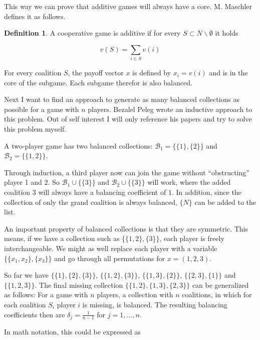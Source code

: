 \documentclass[10pt,a4paper,titlepage]{article}
\theoremstyle{plain}
\theoremstyle{definition}
\newtheorem{definition}[thm]{Definition} %
\begin{document}
This way we can prove that additive games will always have a core. M. Maschler\cite{maschler} defines it as follows.

\begin{definition}
    A cooperative game is additive if for every $S \subset N \backslash \emptyset$ it holds

    \begin{equation}
        v(S) = \sum_{i \in S}v(i)
    \end{equation}
\end{definition}

For every coalition $S$, the payoff vector $x$ is defined by $x_i = v(i)$ and is in the core of the subgame. Each subgame therefor is also balanced.\vspace{8pt}

Next I want to find an approach to generate as many balanced collections as possible for a game with $n$ players. Bezalel Peleg\cite{peleg} wrote an inductive approach to this problem. Out of self interest I will only reference his papers and try to solve this problem myself.

A two-player game has two balanced collections: $\mathcal{B}_1 = \{\{1\}, \{2\}\}$ and $\mathcal{B}_2 = \{\{1, 2\}\}$.

Through induction, a third player now can join the game without \enquote{obstructing} player 1 and 2. So $\mathcal{B}_1 \cup \{\{3\}\}$ and $\mathcal{B}_2 \cup \{\{3\}\}$ will work, where the added coalition ${3}$ will always have a balancing coefficient of $1$. In addition, since the collection of only the grand coalition is always balanced, $\{N\}$ can be added to the list.

An important property of balanced collections is that they are symmetric. This means, if we have a collection such as $\{\{1, 2\}, \{3\}\}$, each player is freely interchangeable. We might as well replace each player with a variable $\{\{x_1, x_2\}, \{x_3\}\}$ and go through all permutations for $x = (1, 2, 3)$.

So far we have $\{\{1\}, \{2\}, \{3\}\}$, $\{\{1, 2\}, \{3\}\}$, $\{\{1, 3\}, \{2\}\}$, $\{\{2, 3\}, \{1\}\}$ and  $\{\{1, 2, 3\}\}$. The final missing collection $\{\{1, 2\}, \{1, 3\}, \{2, 3\}\}$ can be generalized as follows: For a game with $n$ players, a collection with $n$ coalitions, in which for each coalition $S_i$ player $i$ is missing, is balanced. The resulting balancing coefficients then are $\delta_j = \frac{1}{n-1}$ for $j = 1, ..., n$.

In math notation, this could be expressed as
\end{document}
